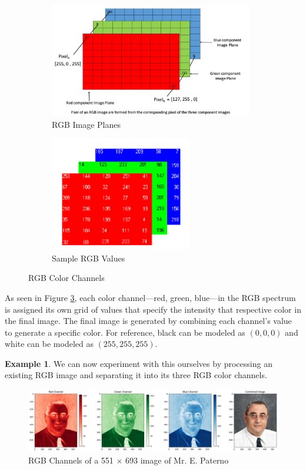 \documentclass[12pt, reqno]{amsart}
\theoremstyle{definition}
\newtheorem{example}[theorem]{Example}
\theoremstyle{remark}
\numberwithin{equation}{section}
\begin{document}
\begin{figure}[h]
    \begin{subfigure}{0.58\linewidth}
        \centering
        \includegraphics[height=5cm]{img/rgb1.jpeg} 
        \caption{RGB Image Planes}
        \label{fig:rgbim1}
    \end{subfigure}
    \begin{subfigure}{0.41\linewidth}
        \centering
        \includegraphics[height=5cm]{img/rgb2.png}
        \caption{Sample RGB Values}
        \label{fig:rgbim2}
    \end{subfigure}
    \caption{RGB Color Channels}
    \label{fig:rgb}
\end{figure}

\noindent As seen in Figure \ref{fig:rgb}, each color channel—red, green, blue—in the RGB spectrum is assigned its own grid of values that specify the intensity that respective color in the final image. The final image is generated by combining each channel's value to generate a specific color. For reference, black can be modeled as $(0, 0, 0)$ and white can be modeled as $(255, 255, 255)$.

\begin{example}
We can now experiment with this ourselves by processing an existing RGB image \cite{Lakhotia} and separating it into its three RGB color channels.
\begin{figure}[h]
    \centering
    \includegraphics[width=\linewidth]{img/rgbchannels.png}
    \caption{RGB Channels of a 551 $\times$ 693 image of Mr. E. Paterno}
    \label{fig:rgbarray}
\end{figure}
\end{example}
\end{document}
